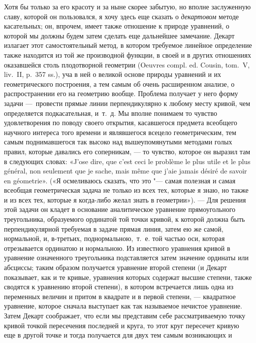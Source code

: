 {Хотя бы только за его красоту и за ныне скорее забытую, но вполне
заслуженную славу, которой он пользовался, я хочу здесь еще сказать о
{\em декартовом} методе касательных; он, впрочем, имеет
также отношение к природе уравнений, о которой мы должны будем затем
сделать еще дальнейшее замечание. Декарт излагает этот самостоятельный
метод, в котором требуемое линейное определение также находится из той же
производной функции, в своей и в других отношениях оказавшейся столь
плодотворной геометрии (Oeuvres compl. ed. Cousin, tom.~V, liv.~II, p.~357
ss.), уча в ней о великой основе природы уравнений и их геометрического
построения, а тем самым об очень расширенном анализе, о распространении его
на геометрию вообще. Проблема получает у него форму задачи —~провести
прямые линии перпендикулярно к любому месту кривой, чем определяется
подкасательная, и~т.~д. Мы вполне понимаем то чувство удовлетворения по
поводу своего открытия, касавшегося предмета всеобщего научного интереса
того времени и являвшегося всецело геометрическим, тем самым поднимавшегося
так высоко над вышеупомянутыми методами голых правил, которые давались его
соперникам, — то чувство, которое он выразил там в следующих словах:
«J’ose dire, que c’est ceci le problème le plus utile et le plus général,
non seulement que je sache, mais même que j’aie jamais désiré de savoir
en géometrie».
(«Я осмеливаюсь сказать, что это "--- самая полезная и самая всеобщая
геометрическая задача не только из всех тех, которые я знаю, но также и из
всех тех, которые я когда-либо желал знать в геометрии»). — Для решения
этой задачи он кладет в основание аналитическое уравнение прямоугольного
треугольника, образуемого ординатой той точки кривой, к которой должна быть
перпендикулярной требуемая в задаче прямая линия, затем ею же самой,
нормальной, и, в-третьих, поднормальною,~т.~е. той частью оси, которая
отрезывается ординатою и нормальною. Из известного уравнения кривой в
уравнение означенного треугольника подставляется затем значение ординаты
или абсциссы; таким образом получается уравнение второй степени (и Декарт
показывает, как и те кривые, уравнения которых содержат высшие степени,
также сводятся к уравнению второй степени), в котором встречается лишь одна
из переменных величин и притом в квадрате и в первой степени, — квадратное
уравнение, которое сначала выступает как так называемое нечистое уравнение.
Затем Декарт соображает, что если мы представим себе рассматриваемую точку
кривой точкой пересечения последней и круга, то этот круг пересечет кривую
еще в другой точке и тогда получается для двух тем самым возникающих и
}
